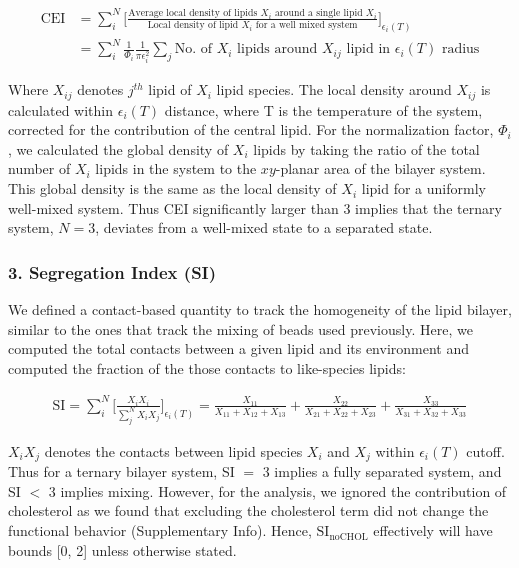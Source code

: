 \documentclass{biophys-new}
\begin{document}
\begin{equation}
    \begin{aligned}
    \label{eq:CEI}
    \text{CEI} {}   & = \sum_{i}^{N}\Bigg[\frac{\text{Average local density of lipids $X_i$ around a single lipid $X_i$}}{\text{Local density of lipid $X_i$ for a well mixed system}}\Bigg]_{\text{$\epsilon_i(T)$}} \\
                    & =  \sum_{i}^{N} \frac{1}{\Phi_i}\frac{1}{\text{$\pi\epsilon_i^2$}}\sum_{j}\text{No. of $X_i$ lipids around $X_{ij}$ lipid in $\epsilon_i(T)$ radius}
    \end{aligned}
\end{equation}

Where $X_{ij}$ denotes $j^{th}$ lipid of $X_i$ lipid species.
The local density around $X_{ij}$ is calculated within $\epsilon_i(T)$ distance, where T is the temperature of the system, corrected
for the contribution of the central lipid.
For the normalization factor, $\Phi_i$,  we calculated the global density of $X_i$ lipids by taking the ratio of the total number of $X_i$ lipids in the system to the $xy$-planar area of the bilayer system.
This global density is the same as the local density of $X_{i}$ lipid for a uniformly well-mixed system.
Thus CEI significantly larger than 3 implies that the ternary system, $N=3$, deviates from a well-mixed state to a separated state.

\subsubsection*{3. Segregation Index (SI)}

We defined a contact-based quantity to track the homogeneity of the lipid bilayer, similar to the ones that track the mixing of beads used previously\cite{Marigo2012, Kumar2020}.
Here, we computed the total contacts between a given lipid and its environment and computed the fraction of the those contacts to like-species lipids:

\begin{equation}
    \begin{aligned}
    \label{eq:CLT}
    \text{SI} = \sum_{i}^{N}\Bigg[\frac{X_iX_i}{\sum_{j}^{N}X_iX_j}\Bigg]_{\text{$\epsilon_i(T)$}} = \frac{X_{11}}{X_{11} + X_{12} + X_{13}} + \frac{X_{22}}{X_{21} + X_{22} + X_{23}} + \frac{X_{33}}{X_{31} + X_{32} + X_{33}}
    \end{aligned}
\end{equation}

$X_iX_j$ denotes the contacts between lipid species $X_i$ and $X_j$ within $\epsilon_i(T)$ cutoff.
Thus for a ternary bilayer system, SI $=$ 3 implies a fully separated system, and SI $<$ 3 implies mixing.
However, for the analysis, we ignored the contribution of cholesterol as we found that excluding the cholesterol term did not change the functional behavior (Supplementary Info).
Hence, $\text{SI}_{\text{noCHOL}}$ effectively will have bounds [0, 2] unless otherwise stated.    
\end{document}
